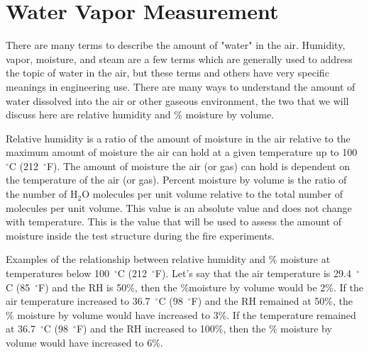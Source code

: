 \documentclass[12pt,oneside]{book}
\begin{document}



\section{Water Vapor Measurement}
There are many terms to describe the amount of "water" in the air.  Humidity, vapor, moisture, and steam are a few terms which are generally used to address the topic of water in the air, but these terms and others have very specific meanings in engineering use.  There are many ways to understand the amount of water dissolved into the air or other gaseous environment, the two that we will discuss here are relative humidity and \% moisture by volume.  

Relative humidity is a ratio of the amount of moisture in the air relative to the maximum amount of moisture the air can hold at a given temperature up to 100~$^\circ$C (212~$^\circ$F).  The amount of moisture the air (or gas) can hold is dependent on the temperature of the air (or gas).  Percent moisture by volume is the ratio of the number of H$_{2}$O molecules per unit volume relative to the total number of molecules per unit volume.  This value is an absolute value and does not change with temperature.  This is the value that will be used to assess the amount of moisture inside the test structure during the fire experiments.  

Examples of the relationship between relative humidity and \% moisture at temperatures below 100~$^\circ$C (212~$^\circ$F).  Let's say that the air temperature is 29.4~$^\circ$C (85~$^\circ$F) and the RH is 50\%, then the \%moisture by volume would be 2\%.   If the air temperature increased to 36.7~$^\circ$C (98~$^\circ$F) and the RH remained at 50\%, the \% moisture by volume would have increased to 3\%.  If the temperature remained at 36.7~$^\circ$C (98~$^\circ$F) and the RH increased to 100\%, then the \% moisture by volume would have increased to 6\%. 
\end{document}

